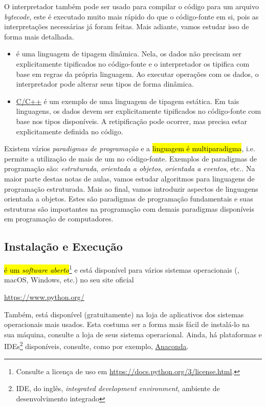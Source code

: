 O interpretador {\python} também pode ser usado para compilar o código para um arquivo \emph{bytecode}, este é executado muito mais rápido do que o código-fonte em si, pois as interpretações necessárias já foram feitas. Mais adiante, vamos estudar isso de forma mais detalhada.

\ifisbook
\newpage
\fi

\begin{itemize}
\item {}

  {\python} é uma linguagem de tipagem dinâmica. Nela, os dados não precisam ser explicitamente tipificados no código-fonte e o interpretador os tipifica com base em regras da própria linguagem. Ao executar operações com os dados, o interpretador pode alterar seus tipos de forma dinâmica.

\item {}

  \href{https://pt.wikipedia.org/wiki/C\%2B\%2B}{C/C++} é um exemplo de uma linguagem de tipagem estática. Em tais linguagens, os dados devem ser explicitamente tipificados no código-fonte com base nos tipos disponíveis. A retipificação pode ocorrer, mas precisa estar explicitamente definida no código.
\end{itemize}

Existem vários \emph{paradigmas de programação} e a \hl{linguagem {\python} é multiparadigma}, i.e. permite a utilização de mais de um no código-fonte. Exemplos de paradigmas de programação são: \emph{estruturada}, \emph{orientada a objetos}, \emph{orientada a eventos}, etc.. Na maior parte destas notas de aulas, vamos estudar algoritmos para linguagens de programação estruturada. Mais ao final, vamos introduzir aspectos de linguagens orientada a objetos. Estes são paradigmas de programação fundamentais e suas estruturas são importantes na programação com demais paradigmas disponíveis em programação de computadores.

\subsection{Instalação e Execução}

\hl{{\python} é um \emph{software aberto}}\footnote{Consulte a licença de uso em \url{https://docs.python.org/3/license.html}.} e está disponível para vários sistemas operacionais ({\linux}, macOS, Windows, etc.) no seu site oficial
\begin{center}
  \url{https://www.python.org/}
\end{center}
Também, está disponível (gratuitamente) na loja de aplicativos dos sistemas operacionais mais usados. Esta costuma ser a forma mais fácil de instalá-lo na sua máquina, consulte a loja de seus sistema operacional. Ainda, há plataformas e IDEs\footnote{IDE, do inglês, \textit{integrated development environment}, ambiente de desenvolvimento integrado} {\python} disponíveis, consulte, como por exemplo, \href{https://www.anaconda.com/}{Anaconda}.

